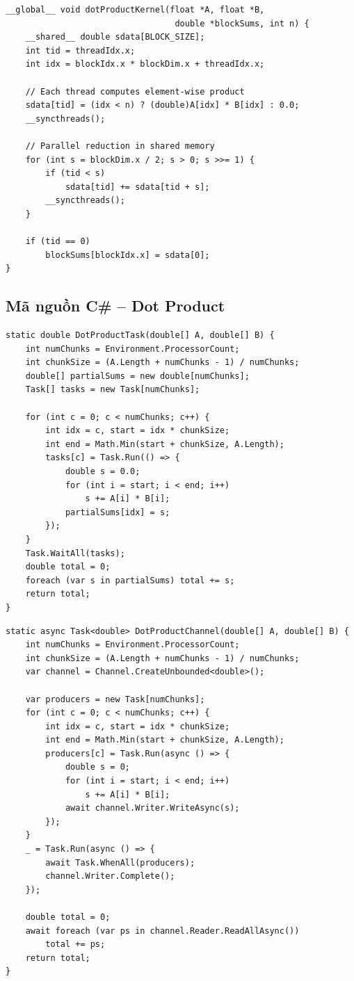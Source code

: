 \documentclass[12pt,a4paper]{article}
\begin{document}
\begin{lstlisting}[style=cudastyle,caption={CUDA Kernel: Dot Product with Parallel Reduction}]
__global__ void dotProductKernel(float *A, float *B,
                                  double *blockSums, int n) {
    __shared__ double sdata[BLOCK_SIZE];
    int tid = threadIdx.x;
    int idx = blockIdx.x * blockDim.x + threadIdx.x;

    // Each thread computes element-wise product
    sdata[tid] = (idx < n) ? (double)A[idx] * B[idx] : 0.0;
    __syncthreads();

    // Parallel reduction in shared memory
    for (int s = blockDim.x / 2; s > 0; s >>= 1) {
        if (tid < s)
            sdata[tid] += sdata[tid + s];
        __syncthreads();
    }

    if (tid == 0)
        blockSums[blockIdx.x] = sdata[0];
}
\end{lstlisting}

\subsection{Mã nguồn C\# -- Dot Product}

\begin{lstlisting}[style=csharpstyle,caption={C\# Thread/Task: Dot Product}]
static double DotProductTask(double[] A, double[] B) {
    int numChunks = Environment.ProcessorCount;
    int chunkSize = (A.Length + numChunks - 1) / numChunks;
    double[] partialSums = new double[numChunks];
    Task[] tasks = new Task[numChunks];

    for (int c = 0; c < numChunks; c++) {
        int idx = c, start = idx * chunkSize;
        int end = Math.Min(start + chunkSize, A.Length);
        tasks[c] = Task.Run(() => {
            double s = 0.0;
            for (int i = start; i < end; i++)
                s += A[i] * B[i];
            partialSums[idx] = s;
        });
    }
    Task.WaitAll(tasks);
    double total = 0;
    foreach (var s in partialSums) total += s;
    return total;
}
\end{lstlisting}

\begin{lstlisting}[style=csharpstyle,caption={C\# Channel: Dot Product}]
static async Task<double> DotProductChannel(double[] A, double[] B) {
    int numChunks = Environment.ProcessorCount;
    int chunkSize = (A.Length + numChunks - 1) / numChunks;
    var channel = Channel.CreateUnbounded<double>();

    var producers = new Task[numChunks];
    for (int c = 0; c < numChunks; c++) {
        int idx = c, start = idx * chunkSize;
        int end = Math.Min(start + chunkSize, A.Length);
        producers[c] = Task.Run(async () => {
            double s = 0;
            for (int i = start; i < end; i++)
                s += A[i] * B[i];
            await channel.Writer.WriteAsync(s);
        });
    }
    _ = Task.Run(async () => {
        await Task.WhenAll(producers);
        channel.Writer.Complete();
    });

    double total = 0;
    await foreach (var ps in channel.Reader.ReadAllAsync())
        total += ps;
    return total;
}
\end{lstlisting}
\end{document}

